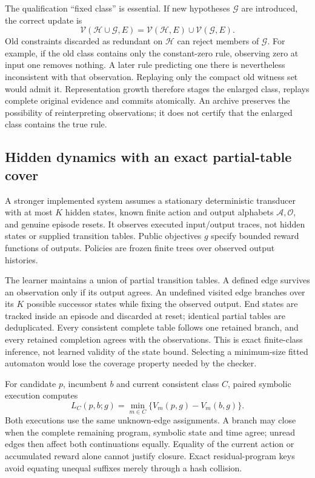 \documentclass[10pt,twocolumn]{article}
\begin{document}
The qualification ``fixed class'' is essential. If new hypotheses $\mathcal G$
are introduced, the correct update is
\begin{equation}\label{eq:expansion}
 \mathcal V(\mathcal H\cup\mathcal G,E)
 =\mathcal V(\mathcal H,E)\cup\mathcal V(\mathcal G,E).
\end{equation}
Old constraints discarded as redundant on $\mathcal H$ can reject members of
$\mathcal G$. For example, if the old class contains only the constant-zero
rule, observing zero at input one removes nothing. A later rule predicting one
there is nevertheless inconsistent with that observation. Replaying only the
compact old witness set would admit it. Representation growth therefore stages
the enlarged class, replays complete original evidence and commits atomically.
An archive preserves the possibility of reinterpreting observations; it does
not certify that the enlarged class contains the true rule.

\subsection{Hidden dynamics with an exact partial-table cover}
A stronger implemented system assumes a stationary deterministic transducer
with at most $K$ hidden states, known finite action and output alphabets
$\mathcal A,\mathcal O$, and genuine episode resets. It observes executed
input/output traces, not hidden states or supplied transition tables. Public
objectives $g$ specify bounded reward functions of outputs. Policies are frozen
finite trees over observed output histories.

The learner maintains a union of partial transition tables. A defined edge
survives an observation only if its output agrees. An undefined visited edge
branches over its $K$ possible successor states while fixing the observed
output. End states are tracked inside an episode and discarded at reset;
identical partial tables are deduplicated. Every consistent complete table
follows one retained branch, and every retained completion agrees with the
observations. This is exact finite-class inference, not learned validity of the
state bound. Selecting a minimum-size fitted automaton would lose the coverage
property needed by the checker.

For candidate $p$, incumbent $b$ and current consistent class $C$, paired
symbolic execution computes
\begin{equation}\label{eq:robust}
 L_C(p,b;g)=\min_{m\in C}\{V_m(p,g)-V_m(b,g)\}.
\end{equation}
Both executions use the same unknown-edge assignments. A branch may close when
the complete remaining program, symbolic state and time agree; unread edges
then affect both continuations equally. Equality of the current action or
accumulated reward alone cannot justify closure. Exact residual-program keys
avoid equating unequal suffixes merely through a hash collision.
\end{document}
